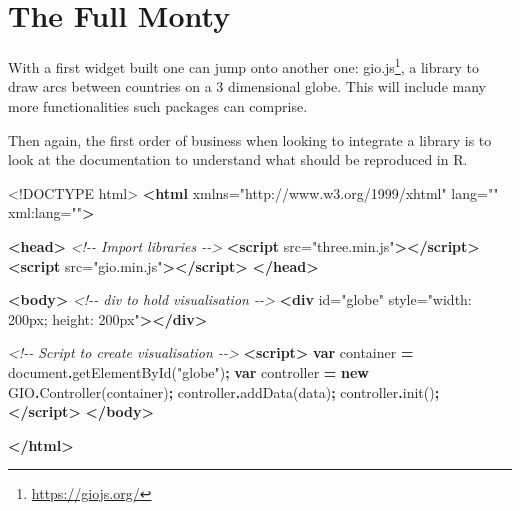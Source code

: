 \documentclass[
]{krantz}
\makeatletter
\newenvironment{Shaded}{\begin{snugshade}}{\end{snugshade}}
\newcommand{\BuiltInTok}[1]{#1}
\newcommand{\CommentTok}[1]{\textcolor[rgb]{0.37,0.37,0.37}{\textit{#1}}}
\newcommand{\DataTypeTok}[1]{\textcolor[rgb]{0.27,0.27,0.27}{#1}}
\newcommand{\FunctionTok}[1]{\textcolor[rgb]{0,0,0}{#1}}
\newcommand{\KeywordTok}[1]{\textcolor[rgb]{0.27,0.27,0.27}{\textbf{#1}}}
\newcommand{\NormalTok}[1]{#1}
\newcommand{\OperatorTok}[1]{\textcolor[rgb]{0.43,0.43,0.43}{\textbf{#1}}}
\newcommand{\OtherTok}[1]{\textcolor[rgb]{0.37,0.37,0.37}{#1}}
\newcommand{\StringTok}[1]{\textcolor[rgb]{0.5,0.5,0.5}{#1}}
\renewcommand{\href}[2]{#2\footnote{\url{#1}}}
\newenvironment{kframe}{%
\medskip{}
\setlength{\fboxsep}{.8em}
 \def\at@end@of@kframe{}%
 \ifinner\ifhmode%
  \def\at@end@of@kframe{\end{minipage}}%
  \begin{minipage}{\columnwidth}%
 \fi\fi%
 \def\FrameCommand##1{\hskip\@totalleftmargin \hskip-\fboxsep
 \colorbox{shadecolor}{##1}\hskip-\fboxsep
     \hskip-\linewidth \hskip-\@totalleftmargin \hskip\columnwidth}%
 \MakeFramed {\advance\hsize-\width
   \@totalleftmargin\z@ \linewidth\hsize
   \@setminipage}}%
 {\par\unskip\endMakeFramed%
 \at@end@of@kframe}
\renewenvironment{Shaded}{\begin{kframe}}{\end{kframe}}
\makeatother
\begin{document}
\hypertarget{the-full-monty}{%
\chapter{The Full Monty}\label{the-full-monty}}

With a first widget built one can jump onto another one: \href{https://giojs.org/}{gio.js}, a library to draw arcs between countries on a 3 dimensional globe. This will include many more functionalities such packages can comprise.

Then again, the first order of business when looking to integrate a library is to look at the documentation to understand what should be reproduced in R.

\begin{Shaded}
\begin{Highlighting}[]
\DataTypeTok{\textless{}!DOCTYPE }\NormalTok{html}\DataTypeTok{\textgreater{}}
\KeywordTok{\textless{}html}\OtherTok{ xmlns=}\StringTok{"http://www.w3.org/1999/xhtml"}\OtherTok{ lang=}\StringTok{""}\OtherTok{ xml:lang=}\StringTok{""}\KeywordTok{\textgreater{}}

\KeywordTok{\textless{}head\textgreater{}}
  \CommentTok{\textless{}!{-}{-} Import libraries {-}{-}\textgreater{}}
  \KeywordTok{\textless{}script}\OtherTok{ src=}\StringTok{"three.min.js"}\KeywordTok{\textgreater{}\textless{}/script\textgreater{}}
  \KeywordTok{\textless{}script}\OtherTok{ src=}\StringTok{"gio.min.js"}\KeywordTok{\textgreater{}\textless{}/script\textgreater{}}
\KeywordTok{\textless{}/head\textgreater{}}

\KeywordTok{\textless{}body\textgreater{}}
  \CommentTok{\textless{}!{-}{-} div to hold visualisation {-}{-}\textgreater{}}
  \KeywordTok{\textless{}div}\OtherTok{ id=}\StringTok{"globe"}\OtherTok{ style=}\StringTok{"width: 200px; height: 200px"}\KeywordTok{\textgreater{}\textless{}/div\textgreater{}}

  \CommentTok{\textless{}!{-}{-} Script to create visualisation {-}{-}\textgreater{}}
  \KeywordTok{\textless{}script\textgreater{}}
    \KeywordTok{var}\NormalTok{ container }\OperatorTok{=} \BuiltInTok{document}\OperatorTok{.}\FunctionTok{getElementById}\NormalTok{(}\StringTok{"globe"}\NormalTok{)}\OperatorTok{;}
    \KeywordTok{var}\NormalTok{ controller }\OperatorTok{=} \KeywordTok{new}\NormalTok{ GIO}\OperatorTok{.}\FunctionTok{Controller}\NormalTok{(container)}\OperatorTok{;}
\NormalTok{    controller}\OperatorTok{.}\FunctionTok{addData}\NormalTok{(data)}\OperatorTok{;}
\NormalTok{    controller}\OperatorTok{.}\FunctionTok{init}\NormalTok{()}\OperatorTok{;}
  \KeywordTok{\textless{}/script\textgreater{}}
\KeywordTok{\textless{}/body\textgreater{}}

\KeywordTok{\textless{}/html\textgreater{}}
\end{Highlighting}
\end{Shaded}
\end{document}
